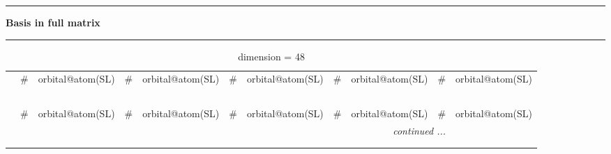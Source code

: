 \documentclass[fleqn,10pt,landscape]{jsarticle}
\begin{document}
\vspace{5mm}
\noindent \rule[0.5mm]{5mm}{0.5mm}\hspace{3mm}\textbf{Basis in full matrix}\hspace{3mm}\leaders\hrule height 0.5mm\hfill\kern0pt
\vspace{3mm}

\renewcommand{\arraystretch}{1.6}
\begin{longtable}[l]{c|cl|cl|cl|cl|cl}
\captionsetup{justification=raggedright, singlelinecheck=off}
\caption{dimension = 48}
 \\
 \hline \hline
 & \# & orbital@atom(SL) & \# & orbital@atom(SL) & \# & orbital@atom(SL) & \# & orbital@atom(SL) & \# & orbital@atom(SL) \\ \hline \endfirsthead

\multicolumn{10}{l}{\tablename\ \thetable{}} \\
 \hline \hline
 & \# & orbital@atom(SL) & \# & orbital@atom(SL) & \# & orbital@atom(SL) & \# & orbital@atom(SL) & \# & orbital@atom(SL) \\ \hline \endhead

 \hline \hline
\multicolumn{10}{r}{\footnotesize\it continued ...} \\ \endfoot

 \hline \hline
\multicolumn{10}{r}{} \\ \endlastfoot


\end{longtable}
\end{document}
